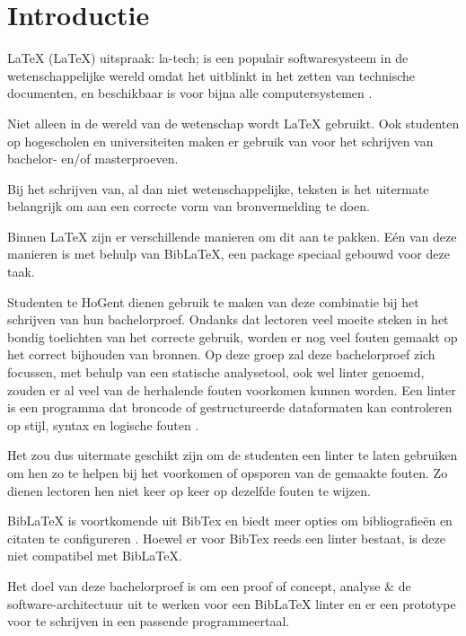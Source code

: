 
\section{Introductie}%
\label{sec:introductie}

LaTeX (\LaTeX) uitspraak: la-tech; is een populair softwaresysteem in de wetenschappelijke wereld omdat het uitblinkt in het zetten van technische documenten,
en beschikbaar is voor bijna alle computersystemen \autocite{Wiki23}.

Niet alleen in de wereld van de wetenschap wordt LaTeX gebruikt. Ook studenten op hogescholen en universiteiten maken er gebruik van voor het schrijven van bachelor- en/of masterproeven.

Bij het schrijven van, al dan niet wetenschappelijke, teksten is het uitermate belangrijk om aan een correcte vorm van bronvermelding te doen.

Binnen LaTeX zijn er verschillende manieren om dit aan te pakken. Eén van deze manieren is met behulp van BibLaTeX, een package speciaal gebouwd voor deze taak.

Studenten te HoGent dienen gebruik te maken van deze combinatie bij het schrijven van hun bachelorproef. Ondanks dat lectoren veel moeite steken in het bondig toelichten van het correcte gebruik, worden er nog veel fouten gemaakt op het correct bijhouden van bronnen. 
Op deze groep zal deze bachelorproef zich focussen, met behulp van een statische analysetool, ook wel linter genoemd, zouden er al veel van de herhalende fouten voorkomen kunnen worden. Een linter is een programma dat broncode of gestructureerde dataformaten kan controleren op stijl, syntax en logische fouten \autocite{Kamunya2023}.

Het zou dus uitermate geschikt zijn om de studenten een linter te laten gebruiken om hen zo te helpen bij het voorkomen of opsporen van de gemaakte fouten. Zo dienen lectoren hen niet keer op keer op dezelfde fouten te wijzen.

BibLaTeX is voortkomende uit BibTex en biedt meer opties om bibliografieën en citaten te configureren \autocite{Cassidy2013}. Hoewel er voor BibTex reeds een linter bestaat, is deze niet compatibel met BibLaTeX.

Het doel van deze bachelorproef is om een proof of concept, analyse \& de software-architectuur uit te werken voor een BibLaTeX linter en er een prototype voor te schrijven in een passende programmeertaal. 

